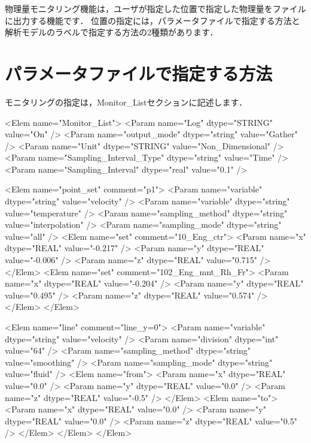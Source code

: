 \graphicspath{{./fig_Monitor/}}


物理量モニタリング機能は，ユーザが指定した位置で指定した物理量をファイルに出力する機能です．
位置の指定には，パラメータファイルで指定する方法と解析モデルのラベルで指定する方法の2種類があります．


\section{パラメータファイルで指定する方法}
モニタリングの指定は，Monitor\_Listセクションに記述します．

{\small
\begin{program}
<Elem name="Monitor_List"> 
  <Param name="Log"                    dtype="STRING" value="On" />
  <Param name="output_mode"            dtype="string" value="Gather" />
  <Param name="Unit"                   dtype="STRING" value="Non_Dimensional" />
  <Param name="Sampling_Interval_Type" dtype="string" value="Time" />
  <Param name="Sampling_Interval"      dtype="real"   value="0.1" />
  
  <Elem name="point_set" comment="p1"> 
    <Param name="variable" dtype="string" value="velocity" /> 
    <Param name="variable" dtype="string" value="temperature" /> 
    <Param name="sampling_method" dtype="string" value="interpolation" /> 
    <Param name="sampling_mode"   dtype="string" value="all" /> 
    <Elem name="set" comment="10_Eng_ctr">
      <Param name="x" dtype="REAL" value="-0.217" /> 
      <Param name="y" dtype="REAL" value="-0.006" /> 
      <Param name="z" dtype="REAL" value="0.715" /> 
    </Elem> 
    <Elem name="set" comment="102_Eng_mnt_Rh_Fr"> 
      <Param name="x" dtype="REAL" value="-0.204" /> 
      <Param name="y" dtype="REAL" value="0.495" /> 
      <Param name="z" dtype="REAL" value="0.574" /> 
    </Elem> 
  </Elem> 

  <Elem name="line" comment="line_y=0"> 
    <Param name="variable" dtype="string" value="velocity" /> 
    <Param name="division" dtype="int" value="64" /> 
    <Param name="sampling_method" dtype="string" value="smoothing" /> 
    <Param name="sampling_mode"   dtype="string" value="fluid" /> 
    <Elem name="from"> 
      <Param name="x" dtype="REAL" value="0.0" /> 
      <Param name="y" dtype="REAL" value="0.0" /> 
      <Param name="z" dtype="REAL" value="-0.5" /> 
    </Elem> 
    <Elem name="to"> 
      <Param name="x" dtype="REAL" value="0.0" /> 
      <Param name="y" dtype="REAL" value="0.0" /> 
      <Param name="z" dtype="REAL" value="0.5" /> 
    </Elem> 
  </Elem> 
</Elem> 
\end{program}
}

